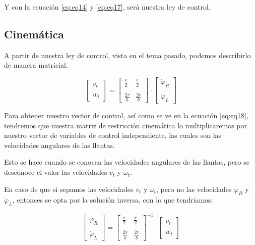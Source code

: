 \documentclass[spanish,10pt,letterpaper, twocolumn]{article}
\begin{document}
Y con la ecuaci\'on \eqref{eq:eq14} y \eqref{eq:eq17}, ser\'a nuestra ley de control.

\subsection{Cinem\'atica}

A partir de nuestra ley de control, vista en el tema pasado, podemos describirlo de manera matricial. 

\begin{equation}
	\label{eq:eq18}
	\begin{bmatrix}
		v_t \\ \\
		w_t
	\end{bmatrix}
	=
	\begin{bmatrix}
		\frac{r}{2} & \frac{r}{2} \\ \\
		\frac{2r}{b} & \frac{2r}{b}
	\end{bmatrix}
	\cdot
	\begin{bmatrix}
		\dot{\varphi}_R \\ \\
		\dot{\varphi}_L
	\end{bmatrix}
\end{equation} 

Para obtener nuestro vector de control, as\'i como se ve en la ecuaci\'on \eqref{eq:eq18}, tendremos que nuestra matriz de restricci\'on cinem\'atica lo multiplicaremos por nuestro vector de variables de control independiente, las cuales son las velocidades angulares de las llantas. 

Esto se hace cuando se conocen las velocidades angulares de las llantas, pero se desconoce el valor las velocidades $v_t$ y $\omega_t$. 

En caso de que si sepamos las velocidades $v_t$ y $\omega_t$, pero no las velocidades $\dot{\varphi}_R$ y $\dot{\varphi}_L$, entonces se opta por la soluci\'on inversa, con lo que tendriamos:

\begin{equation}
	\label{eq:eq19}
	\begin{bmatrix}
		\dot{\varphi}_R \\ \\
		\dot{\varphi}_L
	\end{bmatrix}
	=
	\begin{bmatrix}
		\frac{r}{2} & \frac{r}{2} \\ \\
		\frac{2r}{b} & \frac{2r}{b}
	\end{bmatrix}^{-1}
	\cdot
	\begin{bmatrix}
		v_t \\ \\
		w_t
	\end{bmatrix}
\end{equation} 
\end{document}
